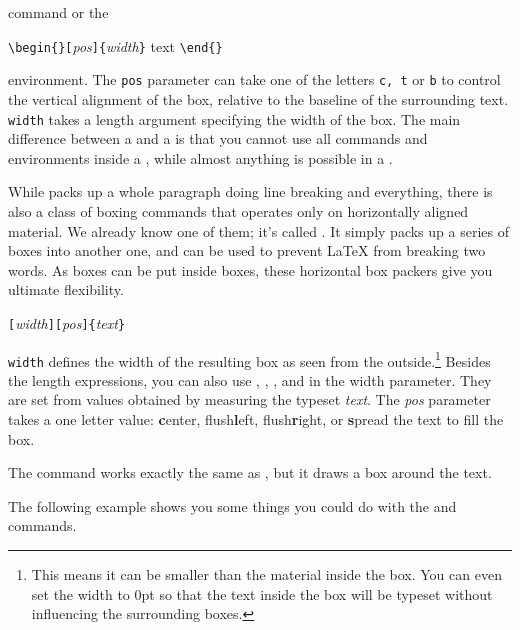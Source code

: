 \noindent command or the

\begin{lscommand}
  \verb|\begin{|\verb|}[|\emph{pos}\verb|]{|\emph{width}\verb|}| text
  \verb|\end{|\verb|}|
\end{lscommand}

\noindent environment. The \texttt{pos} parameter can take one of the letters
\texttt{c, t} or \texttt{b} to control the vertical alignment of the box,
relative to the baseline of the surrounding text. \texttt{width} takes
a length argument specifying the width of the box. The main difference
between a  and a  is that you cannot use all commands
and environments inside a , while almost anything is possible in
a .

While  packs up a whole paragraph doing line breaking and
everything, there is also a class of boxing commands that operates
only on horizontally aligned material. We already know one of them;
it's called . It simply packs up a series of boxes into
another one, and can be used to prevent \LaTeX{} from breaking two
words. As boxes can be put inside boxes, these horizontal box packers
give you ultimate flexibility.

\begin{lscommand}
  \verb|[|\emph{width}\verb|][|\emph{pos}\verb|]{|\emph{text}\verb|}|
\end{lscommand}

\noindent \texttt{width} defines the width of the resulting box as
seen from the outside.\footnote{This means it can be smaller than the
  material inside the box. You can even set the
  width to 0pt so that the text inside the box will be typeset without
  influencing the surrounding boxes.}  Besides the length
expressions, you can also use , , , and
 in the width parameter. They are set from values
obtained by measuring the typeset \emph{text}. The \emph{pos} parameter takes
a one letter value: \textbf{c}enter, flush\textbf{l}eft,
flush\textbf{r}ight, or \textbf{s}pread the text to fill the box.

The command  works exactly the same as , but
it draws a box around the text.

The following example shows you some things you could do with
the  and  commands.


